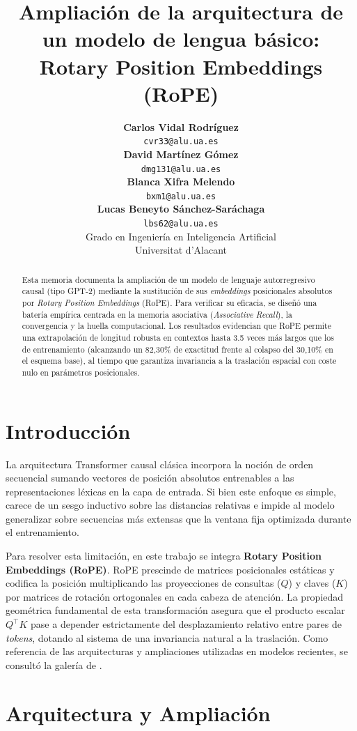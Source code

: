 \documentclass[11pt]{article}
\title{Ampliación de la arquitectura de un modelo de lengua básico: Rotary Position Embeddings (RoPE)}
\author{
  {\footnotesize\textbf{Carlos Vidal Rodríguez}}\\
  {\scriptsize\texttt{cvr33@alu.ua.es}}\\
  \And
  {\footnotesize\textbf{David Martínez Gómez}}\\
  {\scriptsize\texttt{dmg131@alu.ua.es}}\\
  \And
  {\footnotesize\textbf{Blanca Xifra Melendo}}\\
  {\scriptsize\texttt{bxm1@alu.ua.es}}\\
  \And
  {\footnotesize\textbf{Lucas Beneyto Sánchez-Saráchaga}}\\
  {\scriptsize\texttt{lbs62@alu.ua.es}}\\
  \AND
  {\footnotesize Grado en Ingeniería en Inteligencia Artificial}\\
  {\footnotesize Universitat d'Alacant}
}
\date{}
\begin{document}
\maketitle
\begin{abstract}
Esta memoria documenta la ampliación de un modelo de lenguaje autorregresivo causal (tipo GPT-2) mediante la sustitución de sus \textit{embeddings} posicionales absolutos por \textit{Rotary Position Embeddings} (RoPE). Para verificar su eficacia, se diseñó una batería empírica centrada en la memoria asociativa (\textit{Associative Recall}), la convergencia y la huella computacional. Los resultados evidencian que RoPE permite una extrapolación de longitud robusta en contextos hasta 3.5 veces más largos que los de entrenamiento (alcanzando un 82{,}30\% de exactitud frente al colapso del 30{,}10\% en el esquema base), al tiempo que garantiza invariancia a la traslación espacial con coste nulo en parámetros posicionales.
\end{abstract}

\section{Introducción}
La arquitectura Transformer causal clásica incorpora la noción de orden secuencial sumando vectores de posición absolutos entrenables a las representaciones léxicas en la capa de entrada. Si bien este enfoque es simple, carece de un sesgo inductivo sobre las distancias relativas e impide al modelo generalizar sobre secuencias más extensas que la ventana fija optimizada durante el entrenamiento.

Para resolver esta limitación, en este trabajo se integra \textbf{Rotary Position Embeddings (RoPE)}. 
RoPE prescinde de matrices posicionales estáticas y codifica la posición multiplicando las proyecciones de 
consultas ($Q$) y claves ($K$) por matrices de rotación ortogonales en cada cabeza de atención. 
La propiedad geométrica fundamental de esta transformación asegura que el producto escalar $Q^\top K$ pase a 
depender estrictamente del desplazamiento relativo entre pares de \textit{tokens}, dotando al sistema de una invariancia 
natural a la traslación. Como referencia de las arquitecturas y ampliaciones
utilizadas en modelos recientes, se consultó la galería
de \citet{raschkaGallery}.

\section{Arquitectura y Ampliación}
\end{document}
